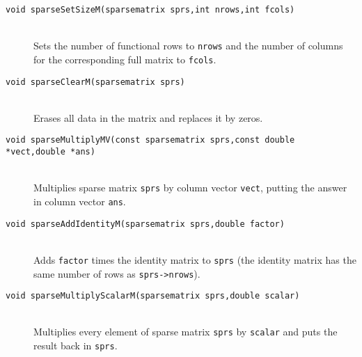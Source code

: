 \documentclass[11pt]{article}
\newcommand {\ttt} {\texttt}
\begin{document}
\begin{description}

\item[\ttt{void sparseSetSizeM(sparsematrix sprs,int nrows,int fcols)}]
\hfill \\
Sets the number of functional rows to \ttt{nrows} and the number of columns for the corresponding full matrix to \ttt{fcols}.

\item[\ttt{void sparseClearM(sparsematrix sprs)}]
\hfill \\
Erases all data in the matrix and replaces it by zeros.


\item[\ttt{void sparseMultiplyMV(const sparsematrix sprs,const double *vect,double *ans)}]
\hfill \\
Multiplies sparse matrix \ttt{sprs} by column vector \ttt{vect}, putting the answer in column vector \ttt{ans}.

\item[\ttt{void sparseAddIdentityM(sparsematrix sprs,double factor)}]
\hfill \\
Adds \ttt{factor} times the identity matrix to \ttt{sprs} (the identity matrix has the same number of rows as \ttt{sprs->nrows}).

\item[\ttt{void sparseMultiplyScalarM(sparsematrix sprs,double scalar)}]
\hfill \\
Multiplies every element of sparse matrix \ttt{sprs} by \ttt{scalar} and puts the result back in \ttt{sprs}.


\end{description}



\end{document}
